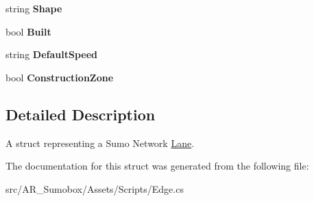 \begin{DoxyCompactItemize}
\item 
\mbox{\label{struct_lane_aa0ac1e2360a777f4396a71b9199937a6}} 
string {\bfseries Shape}
\item 
\mbox{\label{struct_lane_ac0c12c537a72f4ffd85b452492afa5f6}} 
bool {\bfseries Built}
\item 
\mbox{\label{struct_lane_a9519e9d145f9b4cd70c94a9b91339f0b}} 
string {\bfseries Default\+Speed}
\item 
\mbox{\label{struct_lane_a7c8bc75b78dbedae08f88aa78f1205a3}} 
bool {\bfseries Construction\+Zone}
\end{DoxyCompactItemize}


\subsection{Detailed Description}
A struct representing a Sumo Network \mbox{\hyperlink{struct_lane}{Lane}}. 



The documentation for this struct was generated from the following file\+:\begin{DoxyCompactItemize}
\item 
src/\+A\+R\+\_\+\+Sumobox/\+Assets/\+Scripts/Edge.\+cs\end{DoxyCompactItemize}

